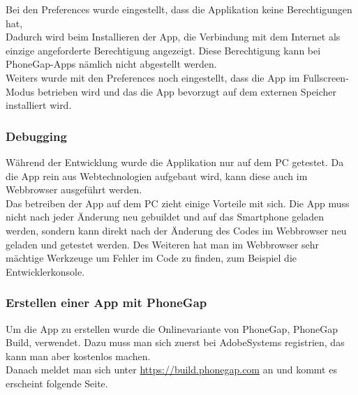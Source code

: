 Bei den Preferences wurde eingestellt, dass die Applikation keine Berechtigungen hat,\\



Dadurch wird beim Installieren der App, die Verbindung mit dem Internet als einzige angeforderte Berechtigung angezeigt. Diese Berechtigung kann bei PhoneGap-Apps nämlich nicht abgestellt werden.\\

Weiters wurde mit den Preferences noch eingestellt, dass die App im Fullscreen-Modus betrieben wird und das die App bevorzugt auf dem externen Speicher installiert wird.\\

\subsubsection{Debugging}
Während der Entwicklung wurde die Applikation nur auf dem PC getestet. Da die App rein aus Webtechnologien aufgebaut wird, kann diese auch im Webbrowser ausgeführt werden.\\
Das betreiben der App auf dem PC zieht einige Vorteile mit sich. Die App muss nicht nach jeder Änderung neu gebuildet und auf das Smartphone geladen werden, sondern kann direkt nach der Änderung des Codes im Webbrowser neu geladen und getestet werden. Des Weiteren hat man im Webbrowser sehr mächtige Werkzeuge um Fehler im Code zu finden, zum Beispiel die Entwicklerkonsole.\\

\subsubsection{Erstellen einer App mit PhoneGap}
Um die App zu erstellen wurde die Onlinevariante von PhoneGap, PhoneGap Build, verwendet. Dazu muss man sich zuerst bei AdobeSystems registrien, das kann man aber kostenlos machen.\\
Danach meldet man sich unter \href{https://build.phonegap.com}{https://build.phonegap.com} an und kommt es erscheint folgende Seite.\\

